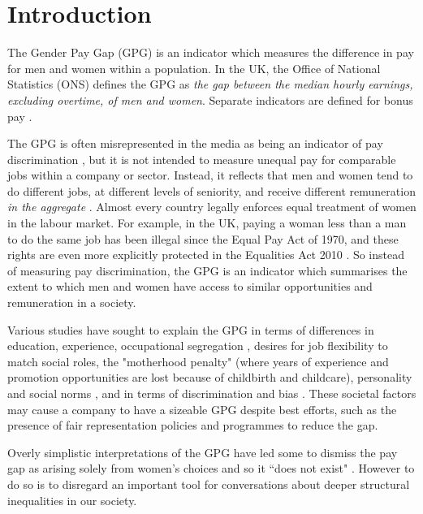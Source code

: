 \section{Introduction}

The Gender Pay Gap (GPG) is an indicator which measures the difference in pay for men and women within a population. In the UK, the Office of National Statistics (ONS) defines the GPG as \textit {the gap between the median hourly earnings, excluding overtime, of men and women}. Separate indicators are defined for bonus pay \cite{ONS2018}.  

The GPG is often misrepresented in the media as being an indicator of pay discrimination \cite{Lukas2011}, but it is not intended to measure unequal pay for comparable jobs within a company or sector. Instead, it reflects that men and women tend to do different jobs, at different levels of seniority, and receive different remuneration \emph{in the aggregate}  \cite{Maschinen}. Almost every country legally enforces equal treatment of women in the labour market. For example, in the UK, paying a woman less than a man to do the same job has been illegal since the Equal Pay Act of 1970, and these rights are even more explicitly protected in the Equalities Act 2010 \cite{GOVUK2017}. So instead of measuring pay discrimination, the GPG is an indicator which summarises the extent to which men and women have access to similar opportunities and remuneration in a society. 

Various studies have sought to explain the GPG in terms of differences in education, experience, occupational segregation \cite{brynin2017gender}, desires for job flexibility to match social roles, the "motherhood penalty" (where years of experience and promotion opportunities are lost because of childbirth and childcare), personality and social norms \cite{leibbrandt2014}, and in terms of discrimination and bias \cite{owideconomicinequalitybygender}.  These societal factors may cause a company to have a sizeable GPG despite best efforts, such as the presence of fair representation policies and programmes to reduce the gap. 

Overly simplistic interpretations of the GPG have led some to dismiss the pay gap as arising solely from women's choices and so it ``does not exist" \cite{Lukas2011}. However to do so is to disregard an important tool for conversations about deeper structural inequalities in our society.

